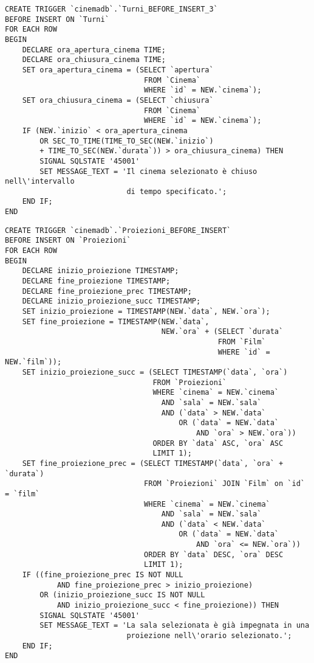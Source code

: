 \begin{verbatim}
CREATE TRIGGER `cinemadb`.`Turni_BEFORE_INSERT_3`
BEFORE INSERT ON `Turni`
FOR EACH ROW
BEGIN
    DECLARE ora_apertura_cinema TIME;
    DECLARE ora_chiusura_cinema TIME;
    SET ora_apertura_cinema = (SELECT `apertura`
                                FROM `Cinema`
                                WHERE `id` = NEW.`cinema`);
    SET ora_chiusura_cinema = (SELECT `chiusura`
                                FROM `Cinema`
                                WHERE `id` = NEW.`cinema`);
    IF (NEW.`inizio` < ora_apertura_cinema
        OR SEC_TO_TIME(TIME_TO_SEC(NEW.`inizio`)
        + TIME_TO_SEC(NEW.`durata`)) > ora_chiusura_cinema) THEN
        SIGNAL SQLSTATE '45001'
        SET MESSAGE_TEXT = 'Il cinema selezionato è chiuso nell\'intervallo
                            di tempo specificato.';
    END IF;
END
\end{verbatim}

\pagebreak
\begin{verbatim}
CREATE TRIGGER `cinemadb`.`Proiezioni_BEFORE_INSERT`
BEFORE INSERT ON `Proiezioni`
FOR EACH ROW
BEGIN
    DECLARE inizio_proiezione TIMESTAMP;
    DECLARE fine_proiezione TIMESTAMP;
    DECLARE fine_proiezione_prec TIMESTAMP;
    DECLARE inizio_proiezione_succ TIMESTAMP;
    SET inizio_proiezione = TIMESTAMP(NEW.`data`, NEW.`ora`);
    SET fine_proiezione = TIMESTAMP(NEW.`data`,
                                    NEW.`ora` + (SELECT `durata`
                                                 FROM `Film`
                                                 WHERE `id` = NEW.`film`));
    SET inizio_proiezione_succ = (SELECT TIMESTAMP(`data`, `ora`)
                                  FROM `Proiezioni`
                                  WHERE `cinema` = NEW.`cinema`
                                    AND `sala` = NEW.`sala`
                                    AND (`data` > NEW.`data`
                                        OR (`data` = NEW.`data`
                                            AND `ora` > NEW.`ora`))
                                  ORDER BY `data` ASC, `ora` ASC
                                  LIMIT 1);
    SET fine_proiezione_prec = (SELECT TIMESTAMP(`data`, `ora` + `durata`)
                                FROM `Proiezioni` JOIN `Film` on `id` = `film`
                                WHERE `cinema` = NEW.`cinema`
                                    AND `sala` = NEW.`sala`
                                    AND (`data` < NEW.`data`
                                        OR (`data` = NEW.`data`
                                            AND `ora` <= NEW.`ora`))
                                ORDER BY `data` DESC, `ora` DESC
                                LIMIT 1);
    IF ((fine_proiezione_prec IS NOT NULL
            AND fine_proiezione_prec > inizio_proiezione)
        OR (inizio_proiezione_succ IS NOT NULL
            AND inizio_proiezione_succ < fine_proiezione)) THEN
        SIGNAL SQLSTATE '45001'
        SET MESSAGE_TEXT = 'La sala selezionata è già impegnata in una
                            proiezione nell\'orario selezionato.';
    END IF;
END
\end{verbatim}

